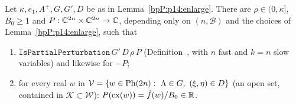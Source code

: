 \begin{proposition}\label{bpP:p14:perturbation}
Let $\kappa,e_1,A^+,G,G',D$ be as in Lemma~\ref{bpP:p14:enlarge}. There are $\rho\in(0,\kappa]$, $B_0\ge1$ and $P:\mathbb{C}^{2n}\times\mathbb{C}^{2n}\to\mathbb{C}$, depending only on $(n,\mathcal B)$ and the choices of Lemma~\ref{bpP:p14:enlarge}, such that
\begin{enumerate}[label=(\roman*)]
\item $\texttt{IsPartialPerturbation}\,G'\,D\,\rho\,P$ (Definition~, with $n$ fast and $k=n$ slow variables) and likewise for $-P$;
\item for every real $w$ in $\mathcal V=\{w\in\Ph{2n}:\ \Lambda\in G,\ (\xi,\eta)\in D\}$ (an open set, contained in $\mathcal K\subset\mathcal W$): $P(\mathrm{cx}(w))=\hat f(w)/B_0\in\mathbb{R}$.
\end{enumerate}
\end{proposition}
